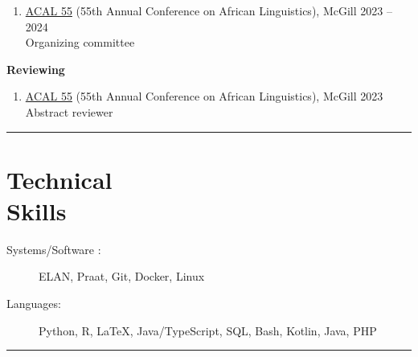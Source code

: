 \documentclass[margin,line]{resume}
\begin{document}
\begin{resume}
\begin{enumerate}[-, leftmargin=1em, topsep=2pt]
		\item[] \href{https://acal55.mull-lab.org/}{ACAL 55} (55th Annual Conference on African Linguistics), McGill \hfill 2023 -- 2024\\
		      \hphantom{...}Organizing committee
	\end{enumerate}

	\textbf{Reviewing}
	\begin{enumerate}[-, leftmargin=1em, topsep=2pt]

		\item[] \href{https://acal55.mull-lab.org/}{ACAL 55} (55th Annual Conference on African Linguistics), McGill \hfill 2023\\
		      \hphantom{...}Abstract reviewer
	\end{enumerate}

	\vspace{-0.9em}\rule{\textwidth}{0.4pt}


	\vspace{-1em}

	\section{\mysidestyle Technical\\Skills}\vspace{2mm}
	\begin{description}
		\item[Systems/Software%
		:] ELAN, Praat, %
		Git, Docker, Linux%
		\item[Languages:] Python, %
		R, \LaTeX, Java/TypeScript, SQL, Bash, Kotlin, Java, PHP
	\end{description}

	\vspace{-2em}\rule{\textwidth}{0.4pt}




\end{resume}
\end{document}
